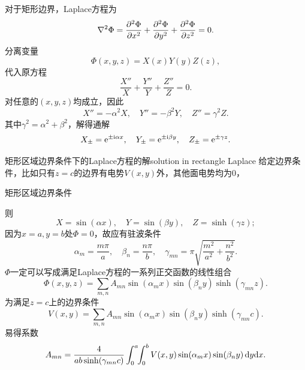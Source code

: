 对于矩形边界，Laplace方程为
\[
    \lapla\Phi=\pv[2]\Phi x+\pv[2]\Phi y+\pv[2]\Phi z=0.
\]
分离变量
\[
    \Phi(x,y,z)=X(x)Y(y)Z(z),
\]
代入原方程 
\[
    \frac{X''}X+\frac{Y''}Y+\frac{Z''}Z=0.
\]
对任意的$(x,y,z)$均成立，因此
\[
    X''=-\alpha^2X,\quad Y''=-\beta^2Y,\quad Z''=\gamma^2Z.
\]
其中$\gamma^2=\alpha^2+\beta^2$，解得通解
\[
    X_\pm=\e{\pm\i\alpha x},\quad Y_\pm=\e{\pm\i\beta y},\quad Z_\pm=\e{\pm\gamma z}.
\]
\begin{example}{矩形区域边界条件下的Laplace方程的解}{solution in rectangle Laplace}
    给定边界条件，比如只有$z=c$的边界有电势$V(x,y)$外，其他面电势均为0，
    \begin{center}
        \tikzchap 矩形区域边界条件
    \end{center}
    则
    \[
        X=\sin(\alpha x),\quad Y=\sin(\beta y),\quad Z=\sinh(\gamma z);
    \]
    因为$x=a,y=b$处$\Phi=0$，故应有驻波条件
    \[
        \alpha_m=\frac{m\pi}a,\quad\beta_n=\frac{n\pi}b,\quad\gamma_{mn}=\pi\sqrt{\frac{m^2}{a^2}+\frac{n^2}{b^2}}.
    \]
    $\Phi$一定可以写成满足Laplace方程的一系列正交函数的线性组合
    \[
        \Phi(x,y,z)=\sum_{m,n}A_{mn}\sin(\alpha_mx)\sin(\beta_ny)\sinh(\gamma_{mn}z).
    \]
    为满足$z=c$上的边界条件
    \[
        V(x,y)=\sum_{m,n}A_{mn}\sin(\alpha_mx)\sin(\beta_ny)\sinh(\gamma_{mn}c).
    \]
    易得系数
    \[
        A_{mn}=\frac4{ab\sinh(\gamma_{mn}c)}\int_0^a\bs3\int_0^bV(x,y)\sin(\alpha_mx)\sin(\beta_ny)\d y\nd x.
    \]
\end{example}
